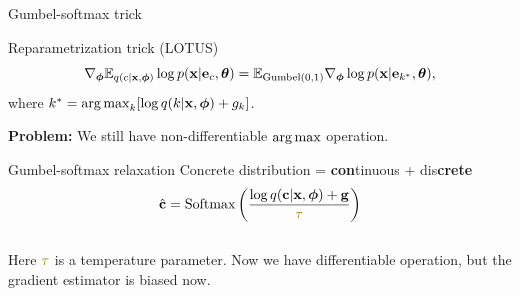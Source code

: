 \documentclass{beamer}
\begin{document}
\begin{frame}{Gumbel-softmax trick}
	\begin{block}{Reparametrization trick (LOTUS)}
		\vspace{-0.7cm}
		\[
			\nabla_{\boldsymbol{\phi}} \mathbb{E}_{q(c | \mathbf{x}, \boldsymbol{\phi})} \log p(\mathbf{x} | \mathbf{e}_{c} , \boldsymbol{\theta}) = \mathbb{E}_{\text{Gumbel}(0, 1)} \nabla_{\boldsymbol{\phi}} \log p(\mathbf{x} | \mathbf{e}_{k^*} , \boldsymbol{\theta}),
		\]
		where $k^* = \operatorname*{arg\,max}_k [\log q(k | \mathbf{x}, \boldsymbol{\phi}) + g_k]$.
	\end{block}
	\textbf{Problem:} We still have non-differentiable $\operatorname*{arg\,max}$ operation.
	
	\begin{block}{Gumbel-softmax relaxation}
		{\color{violet}Con}{\color{teal}crete} distribution = {\color{violet}\textbf{con}tinuous} + {\color{teal}dis\textbf{crete}}
		\[
			\hat{\bc} = \text{Softmax}\left(\frac{\log q(\bc | \bx, \bphi) + \bg}{\color{olive}\tau}\right)
		\]
		\vspace{-0.4cm} \\
		Here ${\color{olive}\tau}$ is a temperature parameter. Now we have differentiable operation, but the gradient estimator is biased now.
 	\end{block}
\end{frame}
\end{document}

